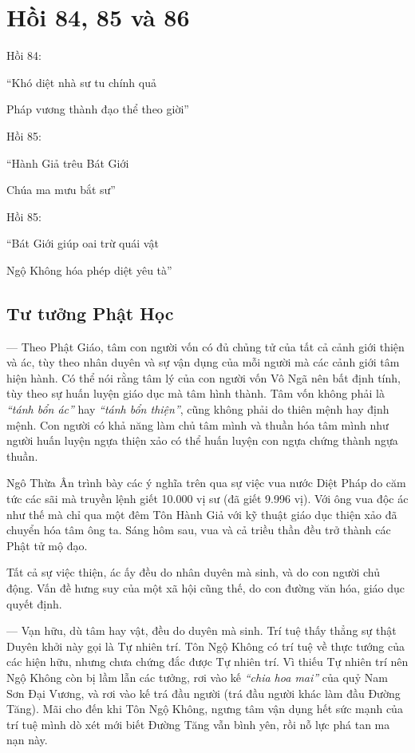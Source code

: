 \chapter{Hồi 84, 85 và 86} %
\label{cha:hoi_84_85}

Hồi 84:

\begin{itshape}
``Khó diệt nhà sư tu chính quả

Pháp vương thành đạo thể theo giời''
\end{itshape}

Hồi 85:

\begin{itshape}
``Hành Giả trêu Bát Giới

Chúa ma mưu bắt sư''
\end{itshape}

Hồi 85:

\begin{itshape}
``Bát Giới giúp oai trừ quái vật

Ngộ Không hóa phép diệt yêu tà''
\end{itshape}

\section{Tư tưởng Phật Học} %
\label{sec:84_85_phat_hoc}

— Theo Phật Giáo, tâm con người vốn có đủ chủng tử của tất cả cảnh giới thiện và ác, tùy theo nhân duyên và sự vận dụng của mỗi người mà các cảnh giới tâm hiện hành. Có thể nói rằng tâm lý của con người vốn Vô Ngã nên bất định tính, tùy theo sự huấn luyện giáo dục mà tâm hình thành. Tâm vốn không phải là \emph{``tánh bổn ác''} hay \emph{``tánh bổn thiện''}, cũng không phải do thiên mệnh hay định mệnh. Con người có khả năng làm chủ tâm mình và thuần hóa tâm mình như người huấn luyện ngựa thiện xảo có thể huấn luyện con ngựa chứng thành ngựa thuần.

Ngô Thừa Ân trình bày các ý nghĩa trên qua sự việc vua nước Diệt Pháp do căm tức các sãi mà truyền lệnh giết 10.000 vị sư (đã giết 9.996 vị). Với ông vua độc ác như thế mà chỉ qua một đêm Tôn Hành Giả với kỹ thuật giáo dục thiện xảo đã chuyển hóa tâm ông ta. Sáng hôm sau, vua và cả triều thần đều trở thành các Phật tử mộ đạo.

Tất cả sự việc thiện, ác ấy đều do nhân duyên mà sinh, và do con người chủ động. Vấn đề hưng suy của một xã hội cũng thế, do con đường văn hóa, giáo dục quyết định.

— Vạn hữu, dù tâm hay vật, đều do duyên mà sinh. Trí tuệ thấy thẳng sự thật Duyên khởi này gọi là Tự nhiên trí. Tôn Ngộ Không có trí tuệ về thực tướng của các hiện hữu, nhưng chưa chứng đắc được Tự nhiên trí. Vì thiếu Tự nhiên trí nên Ngộ Không còn bị lầm lẫn các tưởng, rơi vào kế \emph{``chia hoa mai''} của quỷ Nam Sơn Đại Vương, và rơi vào kế trá đầu người (trá đầu người khác làm đầu Đường Tăng). Mãi cho đến khi Tôn Ngộ Không, ngưng tâm vận dụng hết sức mạnh của trí tuệ mình dò xét mới biết Đường Tăng vẫn bình yên, rồi nỗ lực phá tan ma nạn này.

